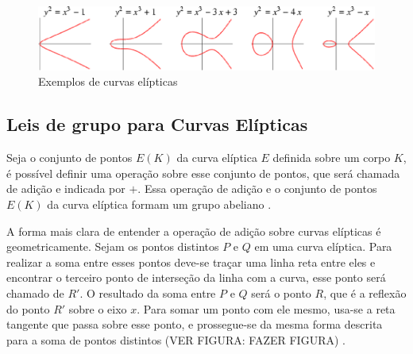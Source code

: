 \begin{figure}[h]
\centering
\includegraphics[scale=0.5, bb=0 0 529 101]{figuras/curvas.eps}
\caption{Exemplos de curvas elípticas}
\label{fig:curvas}
\end{figure}

\subsection{Leis de grupo para Curvas Elípticas}

Seja o conjunto de pontos $E(K)$ da curva elíptica $E$ definida sobre um corpo $K$, é possível definir uma operação sobre esse conjunto de pontos, que será chamada de adição e indicada por $+$. Essa operação de adição e o conjunto de pontos $E(K)$ da curva elíptica formam um grupo abeliano \cite{Stallings:2011}.

A forma mais clara de entender a operação de adição sobre curvas elípticas é geometricamente. Sejam os pontos distintos $P$ e $Q$ em uma curva elíptica. Para realizar a soma entre esses pontos deve-se traçar uma linha reta entre eles e encontrar o terceiro ponto de interseção da linha com a curva, esse ponto será chamado de $R'$. O resultado da soma entre $P$ e $Q$ será o ponto $R$, que é a reflexão do ponto $R'$ sobre o eixo $x$. Para somar um ponto com ele mesmo, usa-se a reta tangente que passa sobre esse ponto, e prossegue-se da mesma forma descrita para a soma de pontos distintos (VER FIGURA: FAZER FIGURA) \cite{Hankerson:2004}.

